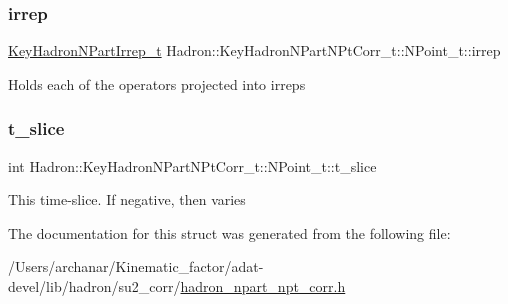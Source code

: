 \subsubsection{\texorpdfstring{irrep}{irrep}}
{\footnotesize\ttfamily \mbox{\hyperlink{structHadron_1_1KeyHadronNPartIrrep__t}{Key\+Hadron\+N\+Part\+Irrep\+\_\+t}} Hadron\+::\+Key\+Hadron\+N\+Part\+N\+Pt\+Corr\+\_\+t\+::\+N\+Point\+\_\+t\+::irrep}

Holds each of the operators projected into irreps \mbox{\label{structHadron_1_1KeyHadronNPartNPtCorr__t_1_1NPoint__t_a9deb6b9a180b16925cccb4c08b1b8fdd}} 
\subsubsection{\texorpdfstring{t\_slice}{t\_slice}}
{\footnotesize\ttfamily int Hadron\+::\+Key\+Hadron\+N\+Part\+N\+Pt\+Corr\+\_\+t\+::\+N\+Point\+\_\+t\+::t\+\_\+slice}

This time-\/slice. If negative, then varies 

The documentation for this struct was generated from the following file\+:\begin{DoxyCompactItemize}
\item 
/\+Users/archanar/\+Kinematic\+\_\+factor/adat-\/devel/lib/hadron/su2\+\_\+corr/\mbox{\hyperlink{adat-devel_2lib_2hadron_2su2__corr_2hadron__npart__npt__corr_8h}{hadron\+\_\+npart\+\_\+npt\+\_\+corr.\+h}}\end{DoxyCompactItemize}
